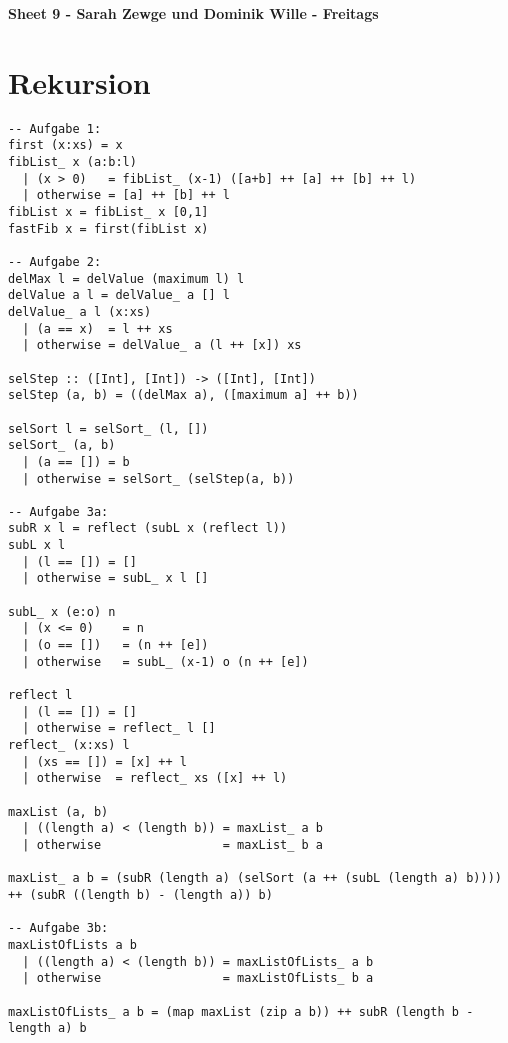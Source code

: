 \documentclass[a4paper, parskip=half]{scrartcl}
\begin{document}
\textbf{\LARGE Sheet 9 - Sarah Zewge und Dominik Wille - Freitags}
  \section{Rekursion}
\begin{verbatim}
-- Aufgabe 1:
first (x:xs) = x
fibList_ x (a:b:l)
  | (x > 0)   = fibList_ (x-1) ([a+b] ++ [a] ++ [b] ++ l)
  | otherwise = [a] ++ [b] ++ l
fibList x = fibList_ x [0,1]
fastFib x = first(fibList x)

-- Aufgabe 2:
delMax l = delValue (maximum l) l
delValue a l = delValue_ a [] l
delValue_ a l (x:xs)
  | (a == x)  = l ++ xs
  | otherwise = delValue_ a (l ++ [x]) xs

selStep :: ([Int], [Int]) -> ([Int], [Int])
selStep (a, b) = ((delMax a), ([maximum a] ++ b))

selSort l = selSort_ (l, [])
selSort_ (a, b)
  | (a == []) = b
  | otherwise = selSort_ (selStep(a, b))

-- Aufgabe 3a:
subR x l = reflect (subL x (reflect l))
subL x l 
  | (l == []) = []
  | otherwise = subL_ x l []

subL_ x (e:o) n
  | (x <= 0)    = n
  | (o == [])   = (n ++ [e])
  | otherwise   = subL_ (x-1) o (n ++ [e])

reflect l
  | (l == []) = []
  | otherwise = reflect_ l []
reflect_ (x:xs) l 
  | (xs == []) = [x] ++ l
  | otherwise  = reflect_ xs ([x] ++ l)

maxList (a, b)
  | ((length a) < (length b)) = maxList_ a b
  | otherwise                 = maxList_ b a

maxList_ a b = (subR (length a) (selSort (a ++ (subL (length a) b)))) ++ (subR ((length b) - (length a)) b)

-- Aufgabe 3b:
maxListOfLists a b
  | ((length a) < (length b)) = maxListOfLists_ a b
  | otherwise                 = maxListOfLists_ b a

maxListOfLists_ a b = (map maxList (zip a b)) ++ subR (length b - length a) b
\end{verbatim}
\end{document}
